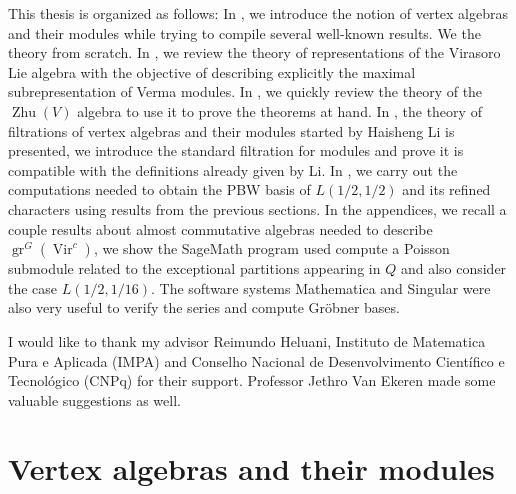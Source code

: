 \documentclass[a4paper, 12pt, reqno]{amsart}
\theoremstyle{remark}
\numberwithin{equation}{subsection}
\DeclareMathOperator{\Vir}{Vir}
\DeclareMathOperator{\gr}{gr}
\DeclareMathOperator{\Zhu}{Zhu}
\begin{document}
This thesis is organized as follows: In , we introduce the notion of vertex algebras and their modules while trying to compile several well-known results.
We the theory from scratch.
In , we review the theory of representations of the Virasoro Lie algebra with the objective of describing explicitly the maximal subrepresentation of Verma modules.
In , we quickly review the theory of the $\Zhu(V)$ algebra to use it to prove the theorems at hand.
In , the theory of filtrations of vertex algebras and their modules started by Haisheng Li is presented, we introduce the standard filtration for modules and prove it is compatible with the definitions already given by Li.
In , we carry out the computations needed to obtain the PBW basis of $L(1/2, 1/2)$ and its refined characters using results from the previous sections.
In the appendices, we recall a couple results about almost commutative algebras needed to describe $\gr^G(\Vir^c)$, we show the SageMath \cite{sagemath} program used compute a Poisson submodule related to the exceptional partitions appearing in $Q$ and also consider the case $L(1/2, 1/16)$.
The software systems Mathematica \cite{Mathematica} and Singular \cite{Singular} were also very useful to verify the series and compute Gr\"{o}bner bases.

I would like to thank my advisor Reimundo Heluani, Instituto de Matematica Pura e Aplicada (IMPA) and Conselho Nacional de Desenvolvimento Científico e Tecnológico (CNPq) for their support.
Professor Jethro Van Ekeren made some valuable suggestions as well.


\section{Vertex algebras and their modules}
\label{sec:vert-algebr-their}
\end{document}
